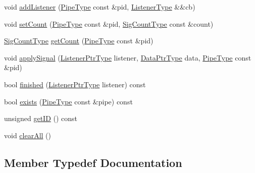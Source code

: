 \begin{DoxyCompactItemize}
\item 
void \hyperlink{structvt_1_1pipe_1_1signal_1_1_signal_holder_aee30c3b7c07d695450e1d6a9953ee98a}{add\+Listener} (\hyperlink{namespacevt_ac9852acda74d1896f48f406cd72c7bd3}{Pipe\+Type} const \&pid, \hyperlink{structvt_1_1pipe_1_1signal_1_1_signal_holder_a23af418129e6e8ecb4ee9621e6fd6f90}{Listener\+Type} \&\&cb)
\item 
void \hyperlink{structvt_1_1pipe_1_1signal_1_1_signal_holder_aa15cf43c4602a9d866f8060746696a45}{set\+Count} (\hyperlink{namespacevt_ac9852acda74d1896f48f406cd72c7bd3}{Pipe\+Type} const \&pid, \hyperlink{structvt_1_1pipe_1_1signal_1_1_signal_holder_aced54515f402b63f6dea174e5b027c81}{Sig\+Count\+Type} const \&count)
\item 
\hyperlink{structvt_1_1pipe_1_1signal_1_1_signal_holder_aced54515f402b63f6dea174e5b027c81}{Sig\+Count\+Type} \hyperlink{structvt_1_1pipe_1_1signal_1_1_signal_holder_aefb0dca5bdcb08b867c24b29f1d48429}{get\+Count} (\hyperlink{namespacevt_ac9852acda74d1896f48f406cd72c7bd3}{Pipe\+Type} const \&pid)
\item 
void \hyperlink{structvt_1_1pipe_1_1signal_1_1_signal_holder_a611fe4b2ce38900245e2f4a9dd40d5dc}{apply\+Signal} (\hyperlink{structvt_1_1pipe_1_1signal_1_1_signal_holder_a68114d1ad5804c71e014736b18e41e08}{Listener\+Ptr\+Type} listener, \hyperlink{structvt_1_1pipe_1_1signal_1_1_signal_holder_aad5bfc2b46dfa071ae638385324d7e31}{Data\+Ptr\+Type} data, \hyperlink{namespacevt_ac9852acda74d1896f48f406cd72c7bd3}{Pipe\+Type} const \&pid)
\item 
bool \hyperlink{structvt_1_1pipe_1_1signal_1_1_signal_holder_aa2d3f4de74295a26df20f26e84f99c4e}{finished} (\hyperlink{structvt_1_1pipe_1_1signal_1_1_signal_holder_a68114d1ad5804c71e014736b18e41e08}{Listener\+Ptr\+Type} listener) const
\item 
bool \hyperlink{structvt_1_1pipe_1_1signal_1_1_signal_holder_aeea971b494ab1e9bd716d4a127194ea3}{exists} (\hyperlink{namespacevt_ac9852acda74d1896f48f406cd72c7bd3}{Pipe\+Type} const \&pipe) const
\item 
unsigned \hyperlink{structvt_1_1pipe_1_1signal_1_1_signal_holder_a5a7daec96f1824691dbeefd9567974b9}{get\+ID} () const
\item 
void \hyperlink{structvt_1_1pipe_1_1signal_1_1_signal_holder_abcd78906fca701244f0f13089b5f5057}{clear\+All} ()
\end{DoxyCompactItemize}


\subsection{Member Typedef Documentation}
\mbox{\label{structvt_1_1pipe_1_1signal_1_1_signal_holder_ade6904d6f651a864bf2e5a657a4b1a13}} 
